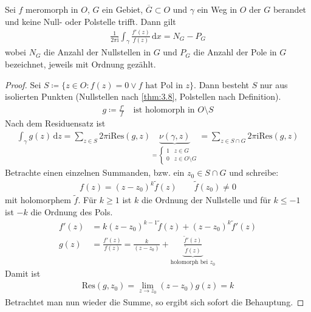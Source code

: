 \begin{theorem} \label{thm:4.21}
  Sei $f$ meromorph in $O$, $G$ ein Gebiet, $\overline{G} \subset O$ und $\gamma$ ein Weg in $O$ der $G$ berandet und keine Null- oder Polstelle trifft. Dann gilt
  \begin{align*}
    \frac{1}{2\pi \mathrm{i}} \int_\gamma \frac{f'(z)}{f(z)} \, \mathrm{d}x = N_G - P_G
  \end{align*}
  wobei $N_G$ die Anzahl der Nullstellen in $G$ und $P_G$ die Anzahl der Pole in $G$ bezeichnet, jeweils mit Ordnung gezählt.

  \begin{proof}
    Sei $S \coloneq \{ z \in O : f(z) = 0 \lor f\text{ hat Pol in }z \}$.
    Dann besteht $S$ nur aus isolierten Punkten (Nullstellen nach \ref{thm:3.8}, Polstellen nach Definition).
    \begin{align*}
      g \coloneq \frac{f'}{f} \quad \text{ist holomorph in $O \setminus S$}
    \end{align*}
    Nach dem Residuensatz ist
    \begin{align*}
      \int_\gamma g(z) \, \mathrm dz = \sum_{z \in S} 2 \pi \mathrm{i} \mathrm{Res}(g,z) \underbrace{\nu(\gamma,z)}_{= \begin{cases} 1 & z \in G \\ 0 & z \in O \setminus G \end{cases}} = \sum_{z \in S \cap G} 2 \pi \mathrm{i} \mathrm{Res}(g,z)
    \end{align*}
    Betrachte einen einzelnen Summanden, bzw. ein $z_0 \in S \cap G$ und schreibe:
    \begin{align*}
      f(z) = (z-z_0)^k \widetilde{f}(z) \qquad \widetilde{f}(z_0) \neq 0
    \end{align*}
    mit holomorphem $\widetilde{f}$.
    Für $k\ge 1$ ist $k$ die Ordnung der Nullstelle und für $k \le -1$ ist $-k$ die Ordnung des Pols.
    \begin{align*}
      f'(z) &= k (z-z_0)^{k-1} \widetilde{f}(z) + (z-z_0)^k \widetilde{f}'(z) \\
      g(z) &= \frac{f'(z)}{f(z)} = \frac{k}{(z-z_0)} + \underbrace{\frac{\widetilde{f}'(z)}{\widetilde{f}(z)}}_{\text{holomorph bei $z_0$}}
    \end{align*}
    Damit ist
    \begin{align*}
      \mathrm{Res}(g,z_0) = \lim\limits_{z \to z_0} (z-z_0) g(z) = k
    \end{align*}
    Betrachtet man nun wieder die Summe, so ergibt sich sofort die Behauptung.
  \end{proof}
\end{theorem}

